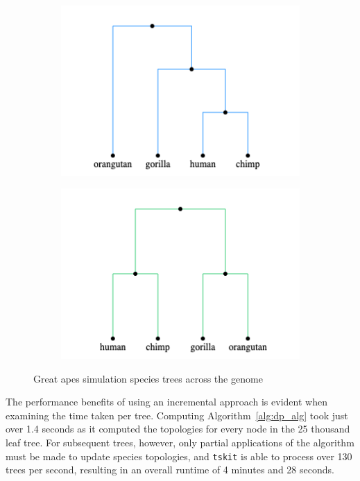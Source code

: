 \documentclass{article}
\newcommand{\tskit}{{\texttt{tskit}}}
\begin{document}
\begin{figure}[H]
\begin{minipage}{.48\textwidth}
\begin{minipage}{.4\textwidth}
\begin{subfigure}[b]{\linewidth}
            \end{subfigure}
        \end{minipage}
        \begin{minipage}{.4\textwidth}
            \begin{subfigure}[b]{\linewidth}
                \includegraphics[scale=0.3]{tree_2.png}
            \end{subfigure}
            \begin{subfigure}[b]{\linewidth}
                \includegraphics[scale=0.3]{tree_3.png}
            \end{subfigure}
        \end{minipage}
    \end{minipage}
    \centering
    \caption{Great apes simulation species trees across the genome}
    \label{fig:great_apes}
\end{figure}

The performance benefits of using an incremental approach is evident when
examining the time taken per tree. Computing Algorithm~\ref{alg:dp_alg}
took just over 1.4 seconds as it computed the topologies for every node in
the 25 thousand leaf tree. For subsequent trees, however, only partial
applications of the algorithm must be made to update species topologies, and
\tskit{} is able to process over 130 trees per second, resulting in an overall
runtime of 4 minutes and 28 seconds.
\end{document}
